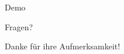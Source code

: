 \documentclass[11pt]{beamer}
\begin{document}
\begin{frame}
  \begin{center}
    Demo
  \end{center}
\end{frame}
\begin{frame}
  \begin{center}
    Fragen?
  \end{center}
\end{frame}
\begin{frame}
  \begin{center}
    Danke für ihre Aufmerksamkeit!
  \end{center}
\end{frame}


\end{document}
